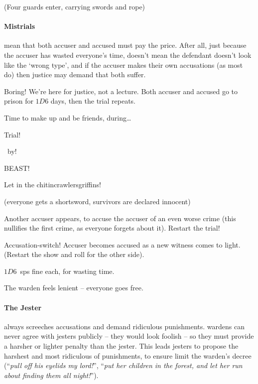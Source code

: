 \begin{multicols}{2}
\begin{dlist}
  (Four guards enter, carrying swords and rope)
\end{dlist}

\paragraph{Mistrials}
mean that both accuser and accused must pay the price.
After all, just because the accuser has wasted everyone's time, doesn't mean the defendant doesn't look like the `wrong type', and if the accuser makes their own accusations (as most do) then justice may demand that both suffer.

\label{mistrials}
\begin{dlist}
  \item
  Boring!
  We're here for justice, not a lecture.
  Both accuser and accused go to prison for $1D6$ days, then the trial repeats.
  \item
  Time to make up and be friends, during\ldots

  Trial!

  ~by!

  BEAST!

  Let in the \ifodd\value{r4} chitincrawlers\else griffins\fi!

  (everyone gets a shortsword, survivors are declared innocent)
  \item
  Another accuser appears, to accuse the accuser of an even worse crime (this nullifies the first crime, as everyone forgets about it).
  Restart the trial!
  \item
  Accusation-switch!
  Accuser becomes accused as a new witness comes to light.
  (Restart the show and roll for the other side).
  \item
  $1D6$~\glspl{sp} fine each, for wasting time.
  \item
  The \gls{warden} feels lenient -- everyone goes free.
\end{dlist}

\paragraph[the Jester]{The Jester}
\label{guildJester}%
always screeches accusations and demand ridiculous punishments.
\Glspl{warden} can never agree with jesters publicly -- they would look foolish -- so they must provide a harsher or lighter penalty than the jester.
This leads jesters to propose the harshest and most ridiculous of punishments, to ensure limit the \gls{warden}'s decree (``\emph{pull off his eyelids my lord!}'', ``\emph{put her children in the forest, and let her run about finding them all night!}'').


\end{multicols}
